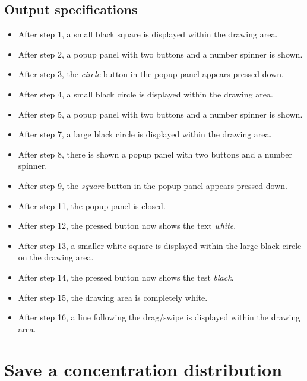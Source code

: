 \subsection*{Output specifications}
\begin{itemize}
\item After step 1, a small black square is displayed within the drawing area.
\item After step 2, a popup panel with two buttons and a number spinner is shown.
\item After step 3, the \emph{circle} button in the popup panel appears pressed down.
\item After step 4, a small black circle is displayed within the drawing area.
\item After step 5, a popup panel with two buttons and a number spinner is shown.
\item After step 7, a large black circle is displayed within the drawing area.
\item After step 8, there is shown a popup panel with two buttons and a number spinner.
\item After step 9, the \emph{square} button in the popup panel appears pressed down.
\item After step 11, the popup panel is closed.
\item After step 12, the pressed button now shows the text \emph{white}.
\item After step 13, a smaller white square is displayed within the large black circle on the drawing area.
\item After step 14, the pressed button now shows the test \emph{black}.
\item After step 15, the drawing area is completely white.
\item After step 16, a line following the drag/swipe is displayed within the drawing area.
\end{itemize}

\section{Save a concentration distribution}

